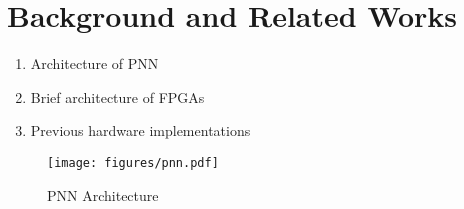 \section{Background and Related Works}
\label{sec_related}

\begin{enumerate}
\item Architecture of PNN
\item Brief architecture of FPGAs
\item Previous hardware implementations
\end{enumerate}

\begin{figure}[t]
\centering
   \texttt{[image: figures/pnn.pdf]}
   \label{fig:pnn}
   \caption{PNN Architecture}
\end{figure}